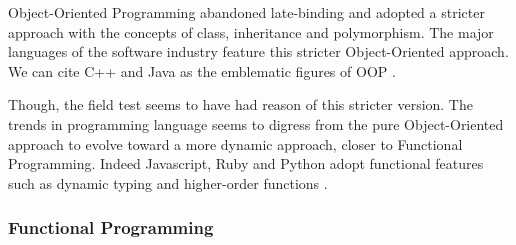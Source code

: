 
Object-Oriented Programming abandoned late-binding and adopted a stricter approach with the concepts of class, inheritance and polymorphism.
The major languages of the software industry feature this stricter Object-Oriented approach.
We can cite C++ and Java as the emblematic figures of OOP \cite{Gosling2000,Stroustrup1986}.

Though, the field test seems to have had reason of this stricter version.
The trends in programming language seems to digress from the pure Object-Oriented approach to evolve toward a more dynamic approach, closer to Functional Programming.
Indeed Javascript, Ruby and Python adopt functional features such as dynamic typing and higher-order functions \cite{Ecma1999}.








\subsubsection{Functional Programming} \label{chapter3:software-design:programming-models:functional-programming}

